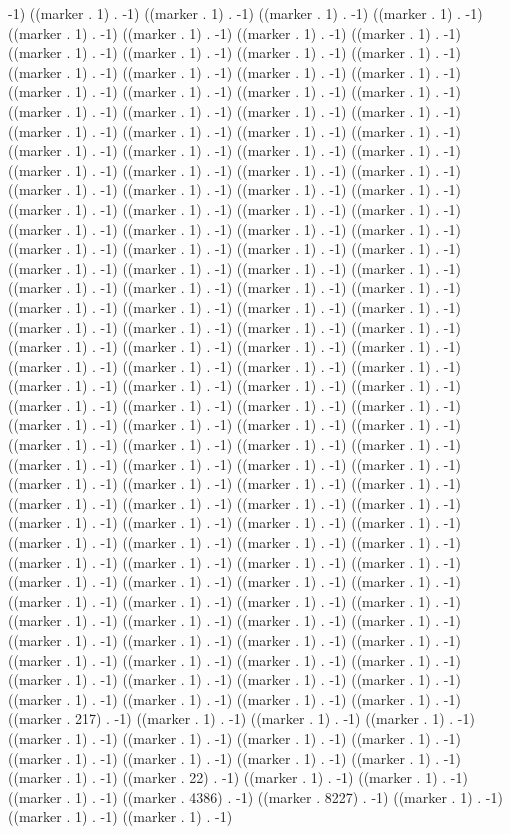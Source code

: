 -1) ((marker . 1) . -1) ((marker . 1) . -1) ((marker . 1) . -1) ((marker . 1) . -1) ((marker . 1) . -1) ((marker . 1) . -1) ((marker . 1) . -1) ((marker . 1) . -1) ((marker . 1) . -1) ((marker . 1) . -1) ((marker . 1) . -1) ((marker . 1) . -1) ((marker . 1) . -1) ((marker . 1) . -1) ((marker . 1) . -1) ((marker . 1) . -1) ((marker . 1) . -1) ((marker . 1) . -1) ((marker . 1) . -1) ((marker . 1) . -1) ((marker . 1) . -1) ((marker . 1) . -1) ((marker . 1) . -1) ((marker . 1) . -1) ((marker . 1) . -1) ((marker . 1) . -1) ((marker . 1) . -1) ((marker . 1) . -1) ((marker . 1) . -1) ((marker . 1) . -1) ((marker . 1) . -1) ((marker . 1) . -1) ((marker . 1) . -1) ((marker . 1) . -1) ((marker . 1) . -1) ((marker . 1) . -1) ((marker . 1) . -1) ((marker . 1) . -1) ((marker . 1) . -1) ((marker . 1) . -1) ((marker . 1) . -1) ((marker . 1) . -1) ((marker . 1) . -1) ((marker . 1) . -1) ((marker . 1) . -1) ((marker . 1) . -1) ((marker . 1) . -1) ((marker . 1) . -1) ((marker . 1) . -1) ((marker . 1) . -1) ((marker . 1) . -1) ((marker . 1) . -1) ((marker . 1) . -1) ((marker . 1) . -1) ((marker . 1) . -1) ((marker . 1) . -1) ((marker . 1) . -1) ((marker . 1) . -1) ((marker . 1) . -1) ((marker . 1) . -1) ((marker . 1) . -1) ((marker . 1) . -1) ((marker . 1) . -1) ((marker . 1) . -1) ((marker . 1) . -1) ((marker . 1) . -1) ((marker . 1) . -1) ((marker . 1) . -1) ((marker . 1) . -1) ((marker . 1) . -1) ((marker . 1) . -1) ((marker . 1) . -1) ((marker . 1) . -1) ((marker . 1) . -1) ((marker . 1) . -1) ((marker . 1) . -1) ((marker . 1) . -1) ((marker . 1) . -1) ((marker . 1) . -1) ((marker . 1) . -1) ((marker . 1) . -1) ((marker . 1) . -1) ((marker . 1) . -1) ((marker . 1) . -1) ((marker . 1) . -1) ((marker . 1) . -1) ((marker . 1) . -1) ((marker . 1) . -1) ((marker . 1) . -1) ((marker . 1) . -1) ((marker . 1) . -1) ((marker . 1) . -1) ((marker . 1) . -1) ((marker . 1) . -1) ((marker . 1) . -1) ((marker . 1) . -1) ((marker . 1) . -1) ((marker . 1) . -1) ((marker . 1) . -1) ((marker . 1) . -1) ((marker . 1) . -1) ((marker . 1) . -1) ((marker . 1) . -1) ((marker . 1) . -1) ((marker . 1) . -1) ((marker . 1) . -1) ((marker . 1) . -1) ((marker . 1) . -1) ((marker . 1) . -1) ((marker . 1) . -1) ((marker . 1) . -1) ((marker . 1) . -1) ((marker . 1) . -1) ((marker . 1) . -1) ((marker . 1) . -1) ((marker . 1) . -1) ((marker . 1) . -1) ((marker . 1) . -1) ((marker . 1) . -1) ((marker . 1) . -1) ((marker . 1) . -1) ((marker . 1) . -1) ((marker . 1) . -1) ((marker . 1) . -1) ((marker . 1) . -1) ((marker . 1) . -1) ((marker . 1) . -1) ((marker . 1) . -1) ((marker . 1) . -1) ((marker . 1) . -1) ((marker . 1) . -1) ((marker . 1) . -1) ((marker . 1) . -1) ((marker . 1) . -1) ((marker . 1) . -1) ((marker . 1) . -1) ((marker . 1) . -1) ((marker . 1) . -1) ((marker . 1) . -1) ((marker . 1) . -1) ((marker . 1) . -1) ((marker . 1) . -1) ((marker . 1) . -1) ((marker . 1) . -1) ((marker . 217) . -1) ((marker . 1) . -1) ((marker . 1) . -1) ((marker . 1) . -1) ((marker . 1) . -1) ((marker . 1) . -1) ((marker . 1) . -1) ((marker . 1) . -1) ((marker . 1) . -1) ((marker . 1) . -1) ((marker . 1) . -1) ((marker . 1) . -1) ((marker . 1) . -1) ((marker . 22) . -1) ((marker . 1) . -1) ((marker . 1) . -1) ((marker . 1) . -1) ((marker . 4386) . -1) ((marker . 8227) . -1) ((marker . 1) . -1) ((marker . 1) . -1) ((marker . 1) . -1) 